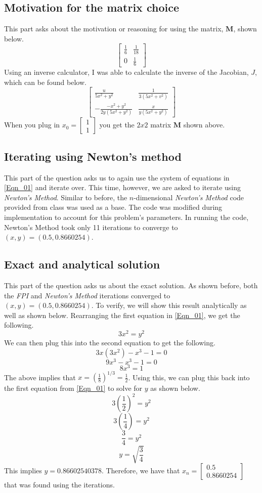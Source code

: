 \documentclass{article}
\begin{document}
\subsection{Motivation for the matrix choice}
This part asks about the motivation or reasoning for using the matrix, \(\mathbf{M}\), shown below.
\[
\begin{bmatrix}
\frac{1}{6} & \frac{1}{18} \\
    0 & \frac{1}{6}
\end{bmatrix}
\]
Using an inverse calculator, I was able to calculate the inverse of the Jacobian, \(J\), which can be found below.
\[
\begin{bmatrix}
    \frac{u}{5x^2+y^2} & \frac{1}{3(5x^2+v^2)} \\
    -\frac{-x^2+y^2}{2y(5x^2+y^2)} & \frac{x}{y(5x^2+y^2)}
\end{bmatrix}
\]
When you plug in \(x_0 = \begin{bmatrix}
    1 \\
    1
\end{bmatrix}\)
you get the \(2x2\) matrix \(\mathbf{M}\) shown above.

\subsection{Iterating using Newton's method}
This part of the question asks us to again use the system of equations in \ref{Eqn_01} and iterate over. This time, however, we are asked to iterate using \textit{Newton's Method}. Similar to before, the \(n\)-dimensional \textit{Newton's Method} code provided from class was used as a base. The code was modified during implementation to account for this problem's parameters. In running the code, Newton's Method took only 11 iterations to converge to \((x,y) = (0.5,0.8660254)\).

\subsection{Exact and analytical solution}
This part of the question asks us about the exact solution. As shown before, both the \textit{FPI} and \textit{Newton's Method} iterations converged to \((x,y) = (0.5,0.8660254)\). To verify, we will show this result analytically as well as shown below. Rearranging the first equation in \ref{Eqn_01}, we get the following.
\[
3x^2 = y^2
\]
We can then plug this into the second equation to get the following.
\[
3x(3x^2)-x^3-1=0
\]
\[
9x^3-x^3-1=0
\]
\[
8x^3=1
\]
The above implies that \(x=(\frac{1}{8})^{1/3} = \frac{1}{2}\). Using this, we can plug this back into the first equation from \ref{Eqn_01} to solve for \(y\) as shown below.
\[
3(\frac{1}{2})^2 = y^2
\]
\[
3(\frac{1}{4}) = y^2
\]
\[
\frac{3}{4} = y^2
\]
\[
y = \sqrt{\frac{3}{4}}
\]
This implies \(y=0.86602540378\). Therefore, we have that \(x_n=\begin{bmatrix}
    0.5 \\
    0.8660254
\end{bmatrix}\) that was found using the iterations.
\end{document}

